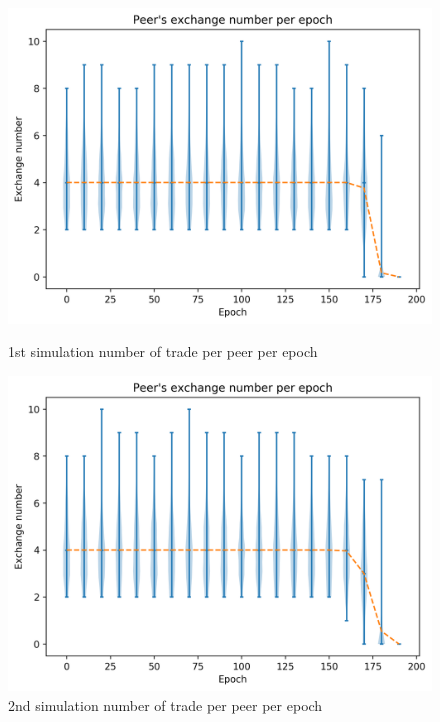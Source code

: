 \documentclass[mscthesis]{usiinfthesis}
\begin{document}
\begin{figure}[!htb]
   \begin{minipage}{0.49\textwidth}
     \centering
     \includegraphics[width=\linewidth]{images/1/1-exchange-number-epoch.png}
  	\caption{1st simulation number of trade per peer per epoch}
  	\label{fig:sim-one-numbers}
   \end{minipage}\hfill
   \begin{minipage}{0.49\textwidth}
     \centering
     \includegraphics[width=\linewidth]{images/2/two-number-of-exchange-per-peer.png}
       \caption{2nd simulation number of trade per peer per epoch}
 		\label{fig:sim-two-numbers}
   \end{minipage}
\end{figure}
\end{document}
